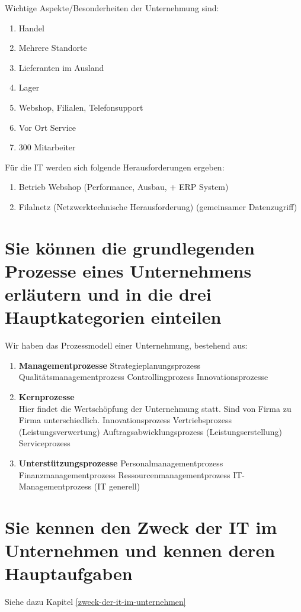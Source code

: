 Wichtige Aspekte/Besonderheiten der Unternehmung sind:
\begin{enumerate}
	\item Handel
	\item Mehrere Standorte
	\item Lieferanten im Ausland
	\item Lager
	\item Webshop, Filialen, Telefonsupport
	\item Vor Ort Service
	\item 300 Mitarbeiter
\end{enumerate}

Für die IT werden sich folgende Herausforderungen ergeben:
\begin{enumerate}
	\item Betrieb Webshop (Performance, Ausbau, + ERP System)
	\item Filalnetz (Netzwerktechnische Herausforderung) (gemeinsamer Datenzugriff)
\end{enumerate}
\section{Sie können die grundlegenden Prozesse eines Unternehmens erläutern und in die drei Hauptkategorien einteilen}
Wir haben das Prozessmodell einer Unternehmung, bestehend aus:
\begin{enumerate}
	\item \textbf{Managementprozesse}
		\subitem Strategieplanungsprozess
		\subitem Qualitätsmanagementprozess
		\subitem Controllingprozess
		\subitem Innovationsprozesse
	\item \textbf{Kernprozesse} \\
		Hier findet die Wertschöpfung der Unternehmung statt. Sind von Firma zu Firma unterschiedlich.
		\subitem Innovationsprozess
		\subitem Vertriebsprozess (Leistungsverwertung)
		\subitem Auftragsabwicklungsprozess (Leistungserstellung)
		\subitem Serviceprozess
	\item \textbf{Unterstützungsprozesse}
		\subitem Personalmanagementprozess
		\subitem Finanzmanagementprozess
		\subitem Ressourcenmanagementprozess
		\subitem IT-Managementprozess (IT generell)
\end{enumerate}

\section{Sie kennen den Zweck der IT im Unternehmen und kennen deren Hauptaufgaben}
Siehe dazu Kapitel \ref{zweck-der-it-im-unternehmen}